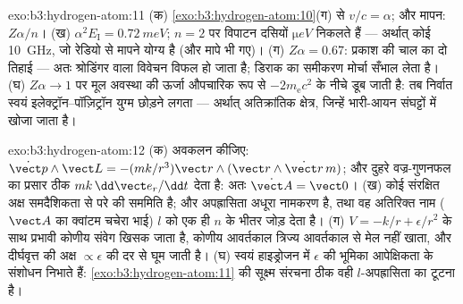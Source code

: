 \begin{solution}{exo:b3:hydrogen-atom:11}
(क) \cref{exo:b3:hydrogen-atom:10}(ग) से $v/c = \alpha$;
और मापन: $Z\alpha/n$। (ख) $\alpha^2E_{\text{I}} = \qty{0.72}{meV}$;
$n = 2$ पर विपाटन दसियों $\unit{\micro eV}$ निकलते हैं ---
अर्थात् कोई \qty{10}{GHz}, जो रेडियो से मापने योग्य है (और मापे भी गए)। (ग) $Z\alpha =
0.67$: प्रकाश की चाल का दो तिहाई --- अतः श्रोडिंगर वाला विवेचन
विफल हो जाता है; डिराक का समीकरण मोर्चा सँभाल लेता है। (घ) $Z\alpha \to 1$ पर
मूल अवस्था की ऊर्जा औपचारिक रूप से $-2m_{\text{e}}c^2$ के नीचे डूब
जाती है: तब निर्वात स्वयं इलेक्ट्रॉन--पॉज़िट्रॉन युग्म छोड़ने लगता ---
अर्थात् अतिक्रांतिक क्षेत्र, जिन्हें भारी-आयन संघट्टों में खोजा जाता है।
\end{solution}

\begin{solution}{exo:b3:hydrogen-atom:12}
(क) अवकलन कीजिए: $\dot{\vect p}\wedge\vect L = -(mk/r^3)\vect
r\wedge(\vect r\wedge\dot{\vect r}\,m)$; और दुहरे वज्र-गुणनफल का
प्रसार ठीक $mk\,\dd\vect e_r/\dd t$ देता है: अतः $\dot{\vect A} =
\vect 0$। (ख) कोई संरक्षित अक्ष समदैशिकता से परे की सममिति है;
और अपह्रासिता अधूरा नामकरण है, तथा वह अतिरिक्त नाम ($\vect
A$ का क्वांटम चचेरा भाई) $l$ को एक ही $n$ के भीतर जोड़ देता है। (ग)
$V = -k/r + \epsilon/r^2$ के साथ प्रभावी कोणीय संवेग खिसक जाता है,
कोणीय आवर्तकाल त्रिज्य आवर्तकाल से मेल नहीं खाता, और
दीर्घवृत्त की अक्ष $\propto\epsilon$ की दर से घूम जाती है। (घ) स्वयं
हाइड्रोजन में $\epsilon$ की भूमिका आपेक्षिकता के संशोधन निभाते हैं:
\cref{exo:b3:hydrogen-atom:11} की सूक्ष्म संरचना ठीक वही
$l$-अपह्रासिता का टूटना है।
\end{solution}


